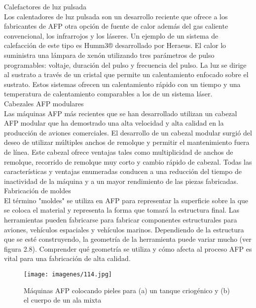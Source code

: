Calefactores de luz pulsada\\
Los calentadores de luz pulsada son un desarrollo reciente que ofrece a los fabricantes de AFP otra opción de fuente de calor además del gas caliente convencional, los infrarrojos y los láseres. Un ejemplo de un sistema de calefacción de este tipo es Humm3® desarrollado por Heraeus. El calor lo suministra una lámpara de xenón utilizando tres parámetros de pulso programables: voltaje, duración del pulso y frecuencia del pulso. La luz se dirige al sustrato a través de un cristal que permite un calentamiento enfocado sobre el sustrato. Estos sistemas ofrecen un calentamiento rápido con un tiempo y una temperatura de calentamiento comparables a los de un sistema láser.\\
Cabezales AFP modulares\\
Las máquinas AFP más recientes que se han desarrollado utilizan un cabezal AFP modular que ha demostrado una alta velocidad y alta calidad en la producción de aviones comerciales. El desarrollo de un cabezal modular surgió del deseo de utilizar múltiples anchos de remolque y permitir el mantenimiento fuera de línea. Este cabezal ofrece ventajas tales como multiplicidad de anchos de remolque, recorrido de remolque muy corto y cambio rápido de cabezal. Todas las características y ventajas enumeradas conducen a una reducción del tiempo de inactividad de la máquina y a un mayor rendimiento de las piezas fabricadas.\\
Fabricación de moldes\\
El término "moldes" se utiliza en AFP para representar la superficie sobre la que se coloca el material y representa la forma que tomará la estructura final. Las herramientas pueden fabricarse para fabricar componentes estructurales para aviones, vehículos espaciales y vehículos marinos. Dependiendo de la estructura que se esté construyendo, la geometría de la herramienta puede variar mucho (ver figura 2.8). Comprender qué geometría se utiliza y cómo afecta al proceso AFP es vital para una fabricación de alta calidad.
\begin{figure}[H]
\begin{center}
\texttt{[image: imagenes/114.jpg]}
\caption{Máquinas AFP colocando pieles para (a) un tanque criogénico y (b) el cuerpo de un ala mixta}
\label{afp}
\end{center}
\end{figure}

